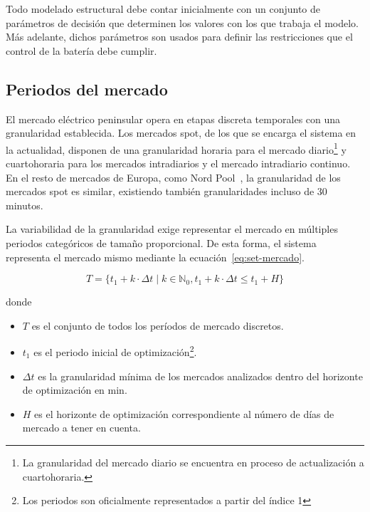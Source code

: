 Todo modelado estructural debe contar inicialmente con un conjunto de parámetros de decisión que determinen los valores con los que trabaja el modelo. Más adelante, dichos parámetros son usados para definir las restricciones que el control de la batería debe cumplir.

\subsection{Periodos del mercado}
\label{makereference5.1.1}

El mercado eléctrico peninsular opera en etapas discreta temporales con una granularidad establecida. Los mercados spot, de los que se encarga el sistema en la actualidad, disponen de una granularidad horaria para el mercado diario\footnote{La granularidad del mercado diario se encuentra en proceso de actualización a cuartohoraria.} y cuartohoraria para los mercados intradiarios y el mercado intradiario continuo. En el resto de mercados de Europa, como Nord Pool~\cite{nord2025leading}, la granularidad de los mercados spot es similar, existiendo también granularidades incluso de 30 minutos.

La variabilidad de la granularidad exige representar el mercado en múltiples periodos categóricos de tamaño proporcional. De esta forma, el sistema representa el mercado mismo mediante la ecuación~\ref{eq:set-mercado}.

\begin{samepage}

  \begin{equation}
    \label{eq:set-mercado}
    T = \{t_{1} + k \cdot \Delta t \mid k \in \mathbb{N}_{0}, t_{1} + k \cdot \Delta t \leq t_{1} + H\}
  \end{equation}

  donde

  \begin{itemize}

    \item \( T \) es el conjunto de todos los períodos de mercado discretos.

    \item \( t_{1} \) es el periodo inicial de optimización\footnote{Los periodos son oficialmente representados a partir del índice 1}.

    \item \( \Delta t \) es la granularidad mínima de los mercados analizados dentro del horizonte de optimización en \si{\minute}.

    \item \( H \) es el horizonte de optimización correspondiente al número de días de mercado a tener en cuenta.

  \end{itemize}

\end{samepage}

